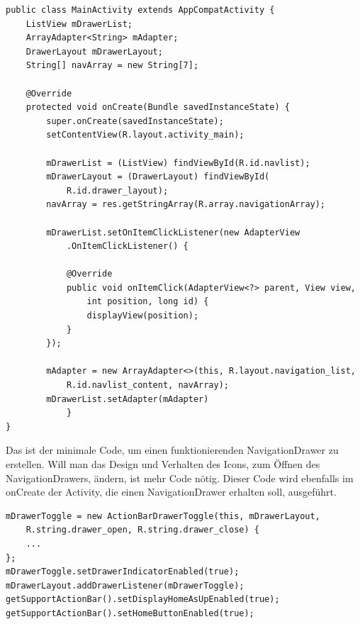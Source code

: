 \documentclass[FIPLY_base.tex]{subfiles}
\begin{document}
\newpage
\begin{lstlisting}[caption={Minimaler Code eines NavigationDrawers},label=DescriptiveLabel]
public class MainActivity extends AppCompatActivity {
	ListView mDrawerList;
	ArrayAdapter<String> mAdapter;
	DrawerLayout mDrawerLayout;
	String[] navArray = new String[7];
	
	@Override
	protected void onCreate(Bundle savedInstanceState) {
		super.onCreate(savedInstanceState);
		setContentView(R.layout.activity_main);
		
		mDrawerList = (ListView) findViewById(R.id.navlist);
		mDrawerLayout = (DrawerLayout) findViewById(
			R.id.drawer_layout);
		navArray = res.getStringArray(R.array.navigationArray);

		mDrawerList.setOnItemClickListener(new AdapterView
			.OnItemClickListener() {
			
			@Override
			public void onItemClick(AdapterView<?> parent, View view, 
				int position, long id) {		
				displayView(position);
			}
		});
	
		mAdapter = new ArrayAdapter<>(this, R.layout.navigation_list, 
			R.id.navlist_content, navArray);
		mDrawerList.setAdapter(mAdapter)
			}
}
\end{lstlisting}
Das ist der minimale Code, um einen funktionierenden NavigationDrawer zu erstellen.
Will man das Design und Verhalten des Icons, zum Öffnen des NavigationDrawers, ändern, ist mehr Code nötig.
Dieser Code wird ebenfalls im onCreate der Activity, die einen NavigationDrawer erhalten soll, ausgeführt.
\begin{lstlisting}[caption={Erweiterung des NavigationDrawers um ihn visuell ansprechender zu machen},label=DescriptiveLabel]
mDrawerToggle = new ActionBarDrawerToggle(this, mDrawerLayout,
	R.string.drawer_open, R.string.drawer_close) {
	...
};
mDrawerToggle.setDrawerIndicatorEnabled(true);
mDrawerLayout.addDrawerListener(mDrawerToggle);
getSupportActionBar().setDisplayHomeAsUpEnabled(true);
getSupportActionBar().setHomeButtonEnabled(true);
\end{lstlisting}
\end{document}
